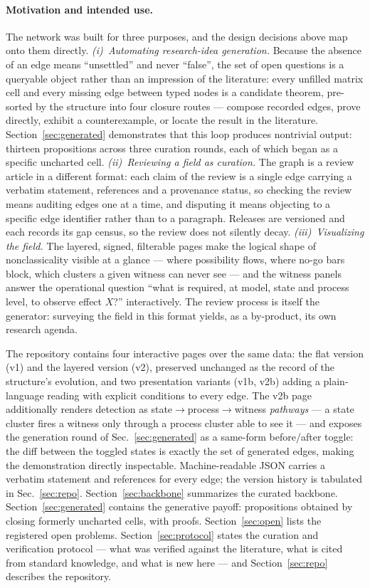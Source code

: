 \documentclass[11pt,a4paper]{article}
\theoremstyle{definition}
\begin{document}
\paragraph{Motivation and intended use.}
The network was built for three purposes, and the design decisions above map
onto them directly.
\emph{(i)~Automating research-idea generation.} Because the absence of an edge
means ``unsettled'' and never ``false'', the set of open questions is a
queryable object rather than an impression of the literature: every unfilled
matrix cell and every missing edge between typed nodes is a candidate theorem,
pre-sorted by the structure into four closure routes --- compose recorded
edges, prove directly, exhibit a counterexample, or locate the result in the
literature. Section~\ref{sec:generated} demonstrates that this loop produces
nontrivial output: thirteen propositions across three curation rounds, each of
which began as a specific uncharted cell.
\emph{(ii)~Reviewing a field as curation.} The graph is a review article in a
different format: each claim of the review is a single edge carrying a
verbatim statement, references and a provenance status, so checking the review
means auditing edges one at a time, and disputing it means objecting to a
specific edge identifier rather than to a paragraph. Releases are versioned
and each records its gap census, so the review does not silently decay.
\emph{(iii)~Visualizing the field.} The layered, signed, filterable pages make
the logical shape of nonclassicality visible at a glance --- where possibility
flows, where no-go bars block, which clusters a given witness can never see
--- and the witness panels answer the operational question ``what is required,
at model, state and process level, to observe effect $X$?'' interactively.
The review process is itself the generator: surveying the field in this format
yields, as a by-product, its own research agenda.

The repository contains four interactive pages over the same data: the flat
version (v1) and the layered version (v2), preserved unchanged as the record
of the structure's evolution, and two presentation variants (v1b, v2b) adding
a plain-language reading with explicit conditions to every edge. The v2b page
additionally renders detection as state$\to$process$\to$witness
\emph{pathways} --- a state cluster fires a witness only through a process
cluster able to see it --- and exposes the generation round of
Sec.~\ref{sec:generated} as a same-form before/after toggle: the diff between
the toggled states is exactly the set of generated edges, making the
demonstration directly inspectable. Machine-readable JSON carries a verbatim
statement and references for every edge; the version history is tabulated in
Sec.~\ref{sec:repo}. Section~\ref{sec:backbone} summarizes the
curated backbone. Section~\ref{sec:generated} contains the generative payoff:
propositions obtained by closing formerly uncharted cells, with proofs.
Section~\ref{sec:open} lists the registered open problems.
Section~\ref{sec:protocol} states the curation and verification protocol ---
what was verified against the literature, what is cited from standard
knowledge, and what is new here --- and Section~\ref{sec:repo} describes the
repository.
\end{document}
